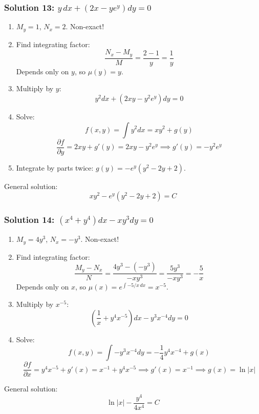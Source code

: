 \documentclass[11pt,letterpaper]{article}
\begin{document}
\subsubsection*{Solution 13: $y\,dx + (2x - y e^y)dy = 0$}
\begin{enumerate}
    \item $M_y = 1$, $N_x = 2$. Non-exact!
    \item Find integrating factor:
    \[ \frac{N_x - M_y}{M} = \frac{2 - 1}{y} = \frac{1}{y} \]
    Depends only on $y$, so $\mu(y) = y$.
    \item Multiply by $y$:
    \[ y^2 dx + (2xy - y^2 e^y)dy = 0 \]
    \item Solve:
    \[ f(x,y) = \int y^2 dx = xy^2 + g(y) \]
    \[ \frac{\partial f}{\partial y} = 2xy + g'(y) = 2xy - y^2 e^y \implies g'(y) = -y^2 e^y \]
    \item Integrate by parts twice: $g(y) = -e^y(y^2 - 2y + 2)$.
\end{enumerate}
General solution:
\[ xy^2 - e^y(y^2 - 2y + 2) = C \]

\subsubsection*{Solution 14: $(x^4 + y^4)dx - x y^3 dy = 0$}
\begin{enumerate}
    \item $M_y = 4y^3$, $N_x = -y^3$. Non-exact!
    \item Find integrating factor:
    \[ \frac{M_y - N_x}{N} = \frac{4y^3 - (-y^3)}{-xy^3} = \frac{5y^3}{-xy^3} = -\frac{5}{x} \]
    Depends only on $x$, so $\mu(x) = e^{\int -5/x \, dx} = x^{-5}$.
    \item Multiply by $x^{-5}$:
    \[ \left(\frac{1}{x} + y^4 x^{-5}\right)dx - y^3 x^{-4} dy = 0 \]
    \item Solve:
    \[ f(x,y) = \int -y^3 x^{-4} dy = -\frac{1}{4}y^4 x^{-4} + g(x) \]
    \[ \frac{\partial f}{\partial x} = y^4 x^{-5} + g'(x) = x^{-1} + y^4 x^{-5} \implies g'(x) = x^{-1} \implies g(x) = \ln|x| \]
\end{enumerate}
General solution:
\[ \ln|x| - \frac{y^4}{4x^4} = C \]
\end{document}
